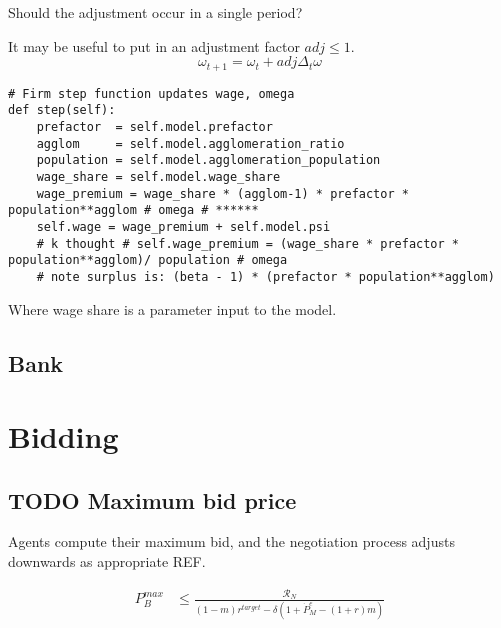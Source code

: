 Should the adjustment occur in a single period?

It may be useful to put in an adjustment factor $adj \le 1$.
\[\omega_{t+1}=\omega_{t} + adj \Delta_t  \omega\]




\begin{lstlisting}
# Firm step function updates wage, omega
def step(self):
    prefactor  = self.model.prefactor
    agglom     = self.model.agglomeration_ratio
    population = self.model.agglomeration_population
    wage_share = self.model.wage_share  
    wage_premium = wage_share * (agglom-1) * prefactor * population**agglom # omega # ****** 
    self.wage = wage_premium + self.model.psi
    # k thought # self.wage_premium = (wage_share * prefactor * population**agglom)/ population # omega    
    # note surplus is: (beta - 1) * (prefactor * population**agglom)
\end{lstlisting}

Where wage share is a parameter input to the model.


\subsection{Bank}

\section{Bidding}


\subsection{TODO Maximum bid price}

Agents compute their maximum bid, and the negotiation process adjusts downwards as appropriate REF.

\begin{eqnarray}
P_B^{max} & \le    \frac{\mathcal{R}_N}{(1-m)r^{target}-\delta \left(1 + \dot P_M^e - (1+r)m\right)} \label{eqn-bid-price} \end{eqnarray}

